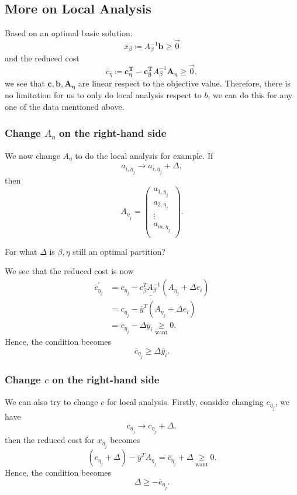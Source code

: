 \subsection{More on Local Analysis}
\begin{prev}
	Based on an optimal basic solution:
	\[
		\overline{x}_{\beta} \coloneqq A^{-1}_{\beta}\bm{b}\geq \vec{0}
	\]
	and the reduced cost
	\[
		\overline{c}_{\eta}\coloneqq \bm{c_{\eta}^{T}} - \bm{c^{T}_{\beta}}A^{-1}_{\beta}\bm{A_{\eta}} \geq \vec{0},
	\]
	we see that \(\bm{c, b, A_{\eta}}\) are linear respect to the objective value. Therefore, there is no limitation for us to only do local analysis
	respect to \(b\), we can do this for any one of the data mentioned above.
\end{prev}

\subsubsection{Change \(A_{\eta}\) on the right-hand side}
We now change \(A_{\eta}\) to do the local analysis for example. If
\[
	a_{i, \eta_j} \to a_{i, \eta_{j}}+\Delta,
\]
then
\[
	A_{\eta_j} = \begin{pmatrix}
		a_{1, \eta_{j}} \\
		a_{2, \eta_{j}} \\
		\vdots          \\
		a_{m, \eta_{j}} \\
	\end{pmatrix}.
\]
\begin{problem}
For what \(\Delta\) is \(\beta, \eta\) still an optimal partition?
\end{problem}

\begin{answer}
	We see that the reduced cost is now
	\[
		\begin{split}
			\overline{c}_{\eta_{j}}^\prime &= c_{\eta_{j}} - \underline{c_{\beta}^{T}A^{-1}_{\beta}}\left( A_{\eta_{j}} +\Delta e_{i}\right) \\
			&= c_{\eta_{j}} - \overline{y}^{T}(A_{\eta_{j}}+\Delta e_{i})\\
			&= \overline{c}_{\eta_{j}} - \Delta \overline{y}_i\underset{\text{want}}{\geq} 0.
		\end{split}
	\]
	Hence, the condition becomes
	\[
		\overline{c}_{\eta_{j}} \geq \Delta \overline{y}_i.
	\]
\end{answer}

\subsubsection{Change \(c\) on the right-hand side}
We can also try to change \(c\) for local analysis. Firstly, consider changing \(c_{\eta_{j}}\), we have
\[
	c_{\eta_{j}}\to c_{\eta_{j}}+\Delta,
\]
then the reduced cost for \(x_{\eta_{j}}\) becomes
\[
	(c_{\eta_{j}}+\Delta) - \overline{y}^{T}A_{\eta_{j}} = \overline{c}_{\eta_{j}}+\Delta\underset{\text{want}}{\geq} 0.
\]
Hence, the condition becomes
\[
	\Delta\geq -\overline{c}_{\eta_{j}}.
\]

